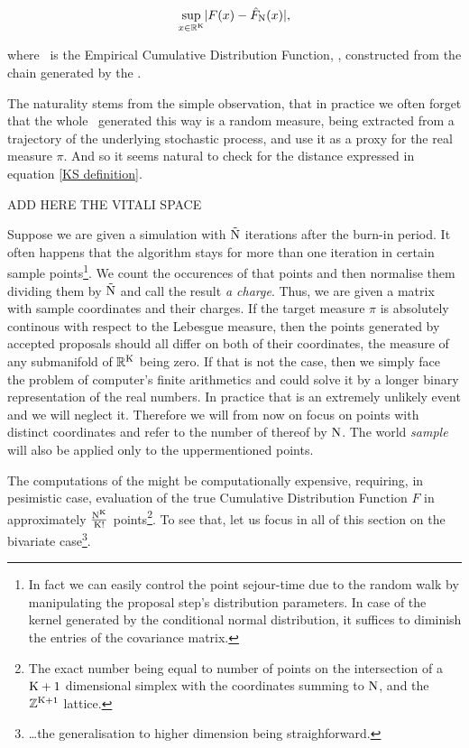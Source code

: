 \begin{equation}\label{KS definition}
	\underset{x \in \mathbb{R}^{\mathrm{K}}}{\sup} | F(x) - \hat{F}_{\mathrm{N}} (x)|,
\end{equation}

where \Fecdf\, is the Empirical Cumulative Distribution Function, \ecdf , constructed from the chain generated by the \PT. 

The naturality stems from the simple observation, that in practice we often forget that the whole \ecdf\, generated this way is a random measure, being extracted from a trajectory of the underlying stochastic process, and use it as a proxy for the real measure $\pi$. And so it seems natural to check for the distance expressed in equation \ref{KS definition}. 

ADD HERE THE VITALI SPACE

Suppose we are given a simulation with $\tilde{\mathrm{N}}$ iterations after the burn-in period. It often happens that the algorithm stays for more than one iteration in certain sample points\footnote{In fact we can easily control the point sejour-time due to the random walk by manipulating the proposal step's distribution parameters. In case of the kernel generated by the conditional normal distribution, it suffices to diminish the entries of the covariance matrix.}. We count the occurences of that points and then normalise them dividing them by $\tilde{\mathrm{N}}$ and call the result {\it a charge}. Thus, we are given a matrix with sample coordinates and their charges. If the target measure $\pi$ is absolutely continous with respect to the Lebesgue measure, then the points generated by accepted proposals should all differ on both of their coordinates, the measure of any submanifold of $\mathbb{R}^{\mathrm{K}}$ being zero. If that is not the case, then we simply face the problem of computer's finite arithmetics and could solve it by a longer binary representation of the real numbers. In practice that is an extremely unlikely event and we will neglect it. Therefore we will from now on focus on points with distinct coordinates and refer to the number of thereof by $\mathrm{N}$. The world {\it sample} will also be applied only to the uppermentioned points. 

The computations of the \KS might be computationally expensive, requiring, in pesimistic case, evaluation of the true Cumulative Distribution Function $F$ in approximately $\frac{\mathrm{N}^{\mathrm{K}}}{\mathrm{K}!}$ points\footnote{The exact number being equal to number of points on the intersection of a $\mathrm{K}+1$ dimensional simplex with the coordinates summing to $\mathrm{N}$, and the $\mathbb{Z}^{\mathrm{K}+1}$ lattice.}. To see that, let us focus in all of this section on the bivariate case\footnote{\dots the generalisation to higher dimension being straighforward.}.   


